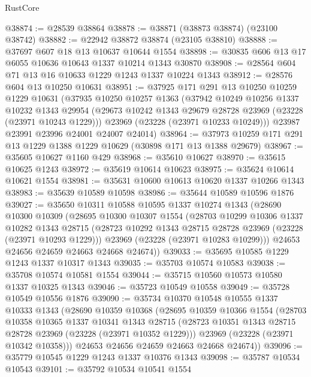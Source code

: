 \begin{lexlean}{RustCore}
\begin{coremodule}
@38874 := @28539 @38864
@38878 := @38871 (@38873 @38874) (@23100 @38742)
@38882 := @22942 @38872 @38874 (@23105 @38810)
@38888 := @37697 @607 @18 @13 @10637 @10644 @1554
@38898 := @30835 @606 @13 @17 @6055 @10636 @10643 @1337 @10214 @1343 @30870
@38908 := @28564 @604 @71 @13 @16 @10633 @1229 @1243 @1337 @10224 @1343
@38912 := @28576 @604 @13 @10250 @10631
@38951 := @37925
    @171
    @291
    @13
    @10250
    @10259
    @1229
    @10631
    (@37935
      @10250
      @10257
      @1363
      (@37942
        @10249
        @10256
        @1337
        @10232
        @1343
        @29954
        (@29673 @10242 @1343 @29679 @28728 @23969 (@23228 (@23971 @10243 @1229)))
        @23969
        (@23228 (@23971 @10233 @10249)))
      @23987
      @23991
      @23996
      @24001
      @24007
      @24014)
@38964 := @37973 @10259 @171 @291 @13 @1229 @1388 @1229 @10629 (@30898 @171 @13 @1388 @29679)
@38967 := @35605 @10627 @1160 @429
@38968 := @35610 @10627
@38970 := @35615 @10625 @1243
@38972 := @35619 @10614 @10623
@38975 := @35624 @10614 @10621 @1554
@38981 := @35631 @10600 @10613 @10620 @1337 @10266 @1343
@38983 := @35639 @10589 @10598
@38986 := @35644 @10589 @10596 @1876
@39027 := @35650
    @10311
    @10588
    @10595
    @1337
    @10274
    @1343
    (@28690
      @10300
      @10309
      (@28695
        @10300
        @10307
        @1554
        (@28703
          @10299
          @10306
          @1337
          @10282
          @1343
          @28715
          (@28723 @10292 @1343 @28715 @28728 @23969 (@23228 (@23971 @10293 @1229)))
          @23969
          (@23228 (@23971 @10283 @10299)))
        @24653
        @24656
        @24659
        @24663
        @24668
        @24674))
@39033 := @35695 @10585 @1229 @1243 @1337 @10317 @1343
@39035 := @35703 @10574 @10583
@39038 := @35708 @10574 @10581 @1554
@39044 := @35715 @10560 @10573 @10580 @1337 @10325 @1343
@39046 := @35723 @10549 @10558
@39049 := @35728 @10549 @10556 @1876
@39090 := @35734
    @10370
    @10548
    @10555
    @1337
    @10333
    @1343
    (@28690
      @10359
      @10368
      (@28695
        @10359
        @10366
        @1554
        (@28703
          @10358
          @10365
          @1337
          @10341
          @1343
          @28715
          (@28723 @10351 @1343 @28715 @28728 @23969 (@23228 (@23971 @10352 @1229)))
          @23969
          (@23228 (@23971 @10342 @10358)))
        @24653
        @24656
        @24659
        @24663
        @24668
        @24674))
@39096 := @35779 @10545 @1229 @1243 @1337 @10376 @1343
@39098 := @35787 @10534 @10543
@39101 := @35792 @10534 @10541 @1554

\end{coremodule}
\end{lexlean}
